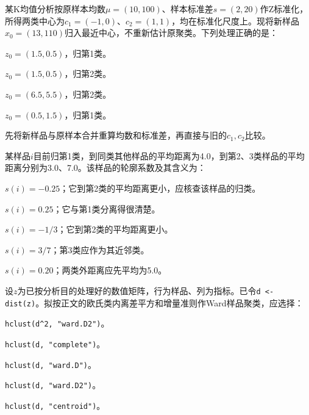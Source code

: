 \par\noindent\begin{minipage}{\linewidth}
某K均值分析按原样本均数$\mu=(10,100)$、样本标准差$s=(2,20)$作Z标准化，所得两类中心为$c_1=(-1,0)$、$c_2=(1,1)$，均在标准化尺度上。现将新样品$x_0=(13,110)$归入最近中心，不重新估计原聚类。下列处理正确的是：
\begin{choices}
\item $z_0=(1.5,0.5)$，归第1类。
\item $z_0=(1.5,0.5)$，归第2类。
\item $z_0=(6.5,5.5)$，归第2类。
\item $z_0=(0.5,1.5)$，归第1类。
\item 先将新样品与原样本合并重算均数和标准差，再直接与旧的$c_1,c_2$比较。
\end{choices}
\end{minipage}\par\medskip

\par\noindent\begin{minipage}{\linewidth}
某样品$i$目前归第1类，到同类其他样品的平均距离为4.0，到第2、3类样品的平均距离分别为3.0、7.0。该样品的轮廓系数及其含义为：
\begin{choices}
\item $s(i)=-0.25$；它到第2类的平均距离更小，应核查该样品的归类。
\item $s(i)=0.25$；它与第1类分离得很清楚。
\item $s(i)=-1/3$；它到第2类的平均距离更小。
\item $s(i)=3/7$；第3类应作为其近邻类。
\item $s(i)=0.20$；两类外距离应先平均为5.0。
\end{choices}
\end{minipage}\par\medskip

\par\noindent\begin{minipage}{\linewidth}
设$z$为已按分析目的处理好的数值矩阵，行为样品、列为指标。已令\texttt{d <- dist(z)}。拟按正文的欧氏类内离差平方和增量准则作Ward样品聚类，应选择：
\begin{choices}
\item \texttt{hclust(d\textasciicircum{}2, "ward.D2")}。
\item \texttt{hclust(d, "complete")}。
\item \texttt{hclust(d, "ward.D")}。
\item \texttt{hclust(d, "ward.D2")}。
\item \texttt{hclust(d, "centroid")}。
\end{choices}
\end{minipage}\par\medskip

